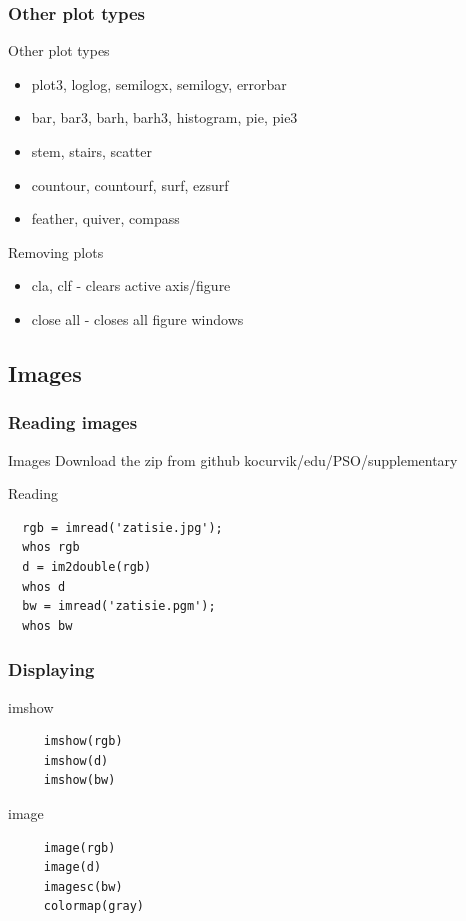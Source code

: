 \documentclass{beamer}
\begin{document}
\begin{frame}
\frametitle{Other plot types}
  
   \begin{block}{Other plot types}
   \begin{itemize}
    \item plot3, loglog, semilogx, semilogy, errorbar
    \item bar, bar3, barh, barh3, histogram, pie, pie3
    \item stem, stairs, scatter
    \item countour, countourf, surf, ezsurf
    \item feather, quiver, compass
   \end{itemize}
  \end{block}
  
  \pause 
  
   \begin{block}{Removing plots}
   \begin{itemize}
    \item cla, clf - clears active axis/figure
    \item close all - closes all figure windows
   \end{itemize}
  \end{block}
\end{frame}

\subsection{Images}

\begin{frame}[fragile]
\frametitle{Reading images}
  
  \begin{block}{Images}
    Download the zip from github kocurvik/edu/PSO/supplementary
  \end{block}
  
  \pause 
  
  \begin{block}{Reading}
  \begin{verbatim}
  rgb = imread('zatisie.jpg');
  whos rgb
  d = im2double(rgb)
  whos d
  bw = imread('zatisie.pgm');
  whos bw \end{verbatim}  
  \end{block}
\end{frame}

\begin{frame}[fragile]
\frametitle{Displaying} 
  \begin{block}{imshow}
  \begin{verbatim}
     imshow(rgb)
     imshow(d)
     imshow(bw)   \end{verbatim}  
  \end{block}
  
  \pause
  
  \begin{block}{image}
  \begin{verbatim}
     image(rgb)
     image(d)
     imagesc(bw)
     colormap(gray)   \end{verbatim}  
  \end{block}
\end{frame}
\end{document}

